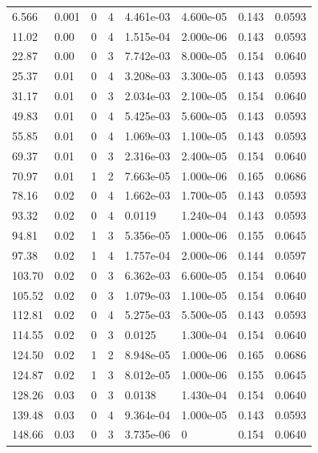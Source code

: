 \documentclass[preview]{standalone}
\begin{document}
{{\begin{tabular}{L{1.2cm}C{1.2cm} C{0.3cm}C{0.5cm} C{1.4cm}C{1.4cm} C{1.4cm}C{1.4cm}}
  6.566  &  0.001  & 0     &  4 &  4.461e-03  & 4.600e-05  & 0.143 &  0.0593   \\ 
  11.02  &  0.00  & 0     &  4 &  1.515e-04  & 2.000e-06  & 0.143 &  0.0593   \\ 
  22.87  &  0.00  & 0     &  3 &  7.742e-03  & 8.000e-05  & 0.154 &  0.0640   \\ 
  25.37  &  0.01  & 0     &  4 &  3.208e-03  & 3.300e-05  & 0.143 &  0.0593   \\ 
  31.17  &  0.01  & 0     &  3 &  2.034e-03  & 2.100e-05  & 0.154 &  0.0640   \\ 
  49.83  &  0.01  & 0     &  4 &  5.425e-03  & 5.600e-05  & 0.143 &  0.0593   \\ 
  55.85  &  0.01  & 0     &  4 &  1.069e-03  & 1.100e-05  & 0.143 &  0.0593   \\ 
  69.37  &  0.01  & 0     &  3 &  2.316e-03  & 2.400e-05  & 0.154 &  0.0640   \\ 
  70.97  &  0.01  & 1     &  2 &  7.663e-05  & 1.000e-06  & 0.165 &  0.0686   \\ 
  78.16  &  0.02  & 0     &  4 &  1.662e-03  & 1.700e-05  & 0.143 &  0.0593   \\ 
  93.32  &  0.02  & 0     &  4 &  0.0119  & 1.240e-04  & 0.143 &  0.0593   \\ 
  94.81  &  0.02  & 1     &  3 &  5.356e-05  & 1.000e-06  & 0.155 &  0.0645   \\ 
  97.38  &  0.02  & 1     &  4 &  1.757e-04  & 2.000e-06  & 0.144 &  0.0597   \\ 
  103.70  &  0.02  & 0     &  3 &  6.362e-03  & 6.600e-05  & 0.154 &  0.0640   \\ 
  105.52  &  0.02  & 0     &  3 &  1.079e-03  & 1.100e-05  & 0.154 &  0.0640   \\ 
  112.81  &  0.02  & 0     &  4 &  5.275e-03  & 5.500e-05  & 0.143 &  0.0593   \\ 
  114.55  &  0.02  & 0     &  3 &  0.0125  & 1.300e-04  & 0.154 &  0.0640   \\ 
  124.50  &  0.02  & 1     &  2 &  8.948e-05  & 1.000e-06  & 0.165 &  0.0686   \\ 
  124.87  &  0.02  & 1     &  3 &  8.012e-05  & 1.000e-06  & 0.155 &  0.0645   \\ 
  128.26  &  0.03  & 0     &  3 &  0.0138  & 1.430e-04  & 0.154 &  0.0640   \\ 
  139.48  &  0.03  & 0     &  4 &  9.364e-04  & 1.000e-05  & 0.143 &  0.0593   \\ 
  148.66  &  0.03  & 0     &  3 &  3.735e-06  & 0  & 0.154 &  0.0640   \\ 

\end{tabular}}}
\end{document}
